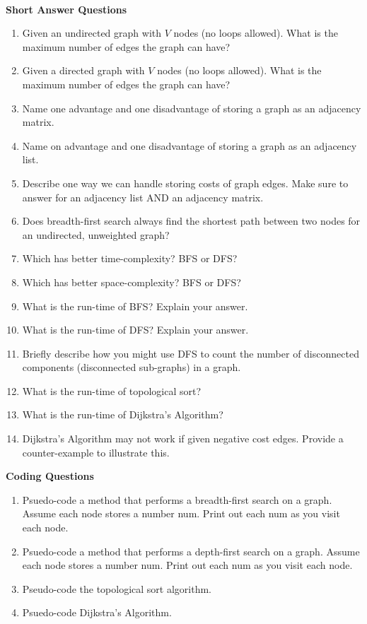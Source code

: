 \documentclass[10pt]{article}
\newcounter{pagenum}
\newcommand{\pageheader}[1]{
\clearpage\vspace*{-0.4in}\noindent{\large\bf{{#1}}}
\addtocounter{pagenum}{1}
\cfoot{}
}
\begin{document}

\pageheader{Graphs - Basic}

\noindent \\
\textbf{Short Answer Questions}

\begin{enumerate}
	\setlength\itemsep{0.25em}
	\item Given an undirected graph with $V$ nodes (no loops allowed). What is the maximum number of edges the graph can have?
	\item Given a directed graph with $V$ nodes (no loops allowed). What is the maximum number of edges the graph can have?
	\item Name one advantage and one disadvantage of storing a graph as an adjacency matrix.
	\item Name on advantage and one disadvantage of storing a graph as an adjacency list.
	\item Describe one way we can handle storing costs of graph edges. Make sure to answer for an adjacency list AND an adjacency matrix.
	\item Does breadth-first search always find the shortest path between two nodes for an undirected, unweighted graph?
	\item Which has better time-complexity? BFS or DFS?
	\item Which has better space-complexity? BFS or DFS?
	\item What is the run-time of BFS? Explain your answer.
	\item What is the run-time of DFS? Explain your answer.
	\item Briefly describe how you might use DFS to count the number of disconnected components (disconnected sub-graphs) in a graph.
	\item What is the run-time of topological sort?
	\item What is the run-time of Dijkstra's Algorithm?
	\item Dijkstra's Algorithm may not work if given negative cost edges. Provide a counter-example to illustrate this.
\end{enumerate}

\vspace{0.5in}

\textbf{Coding Questions}
\begin{enumerate}
	\setlength\itemsep{0.25em}
	\item Psuedo-code a method that performs a breadth-first search on a graph. Assume each node stores a number num. Print out each num as you visit each node.
	\item Psuedo-code a method that performs a depth-first search on a graph. Assume each node stores a number num. Print out each num as you visit each node.
	\item Pseudo-code the topological sort algorithm.
	\item Psuedo-code Dijkstra's Algorithm.
\end{enumerate}
\end{document}
